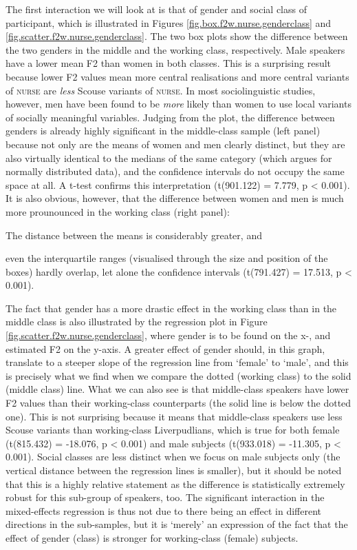 The first interaction we will look at is that of gender and social class of participant, which is illustrated in Figures \ref{fig.box.f2w.nurse.genderclass} and \ref{fig.scatter.f2w.nurse.genderclass}.
The two box plots show the difference between the two genders in the middle and the working class, respectively.
Male speakers have a lower mean F2 than women in both classes.
This is a surprising result because lower F2 values mean more central realisations and more central variants of \textsc{nurse} are \emph{less} Scouse variants of \textsc{nurse}.
In most sociolinguistic studies, however, men have been found to be \emph{more} likely than women to use local variants of socially meaningful variables.
Judging from the plot, the difference between genders is already highly significant in the middle-class sample (left panel) because not only are the means of women and men clearly distinct, but they are also virtually identical to the medians of the same category (which argues for normally distributed data), and the confidence intervals do not occupy the same space at all.
A t-test confirms this interpretation (t(901.122) = 7.779, p < 0.001).
It is also obvious, however, that the difference between women and men is much more prounounced in the working class (right panel):
\begin{inparaenum}[(a)]
	\item The distance between the means is considerably greater, and
	\item even the interquartile ranges (visualised through the size and position of the boxes) hardly overlap, let alone the confidence intervals (t(791.427) = 17.513, p < 0.001).
\end{inparaenum}

The fact that gender has a more drastic effect in the working class than in the middle class is also illustrated by the regression plot in Figure \ref{fig.scatter.f2w.nurse.genderclass}, where gender is to be found on the x-, and estimated F2 on the y-axis.
A greater effect of gender should, in this graph, translate to a steeper slope of the regression line from `female' to `male', and this is precisely what we find when we compare the dotted (working class) to the solid (middle class) line.
What we can also see is that middle-class speakers have lower F2 values than their working-class counterparts (the solid line is below the dotted one).
This is not surprising because it means that middle-class speakers use less Scouse variants than working-class Liverpudlians, which is true for both female (t(815.432) = -18.076, p < 0.001) and male subjects (t(933.018) = -11.305, p < 0.001).
Social classes are less distinct when we focus on male subjects only (the vertical distance between the regression lines is smaller), but it should be noted that this is a highly relative statement as the difference is statistically extremely robust for this sub-group of speakers, too.
The significant interaction in the mixed-effects regression is thus not due to there being an effect in different directions in the sub-samples, but it is `merely' an expression of the fact that the effect of gender (class) is stronger for working-class (female) subjects.

